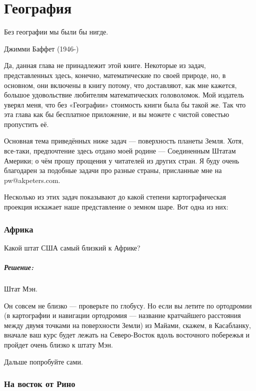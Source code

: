 \chapter*{География}

\epigraph{Без географии  мы были бы нигде.}{Джимми Баффет (1946-)}


Да, данная глава не принадлежит этой книге. %
Некоторые из задач, представленных здесь, конечно, математические по своей природе, %
но,  в основном, они включены в книгу потому, что доставляют, как  мне кажется, большое удовольствие любителям математических головоломок.  Мой издатель уверял меня, что без «Географии» стоимость книги была бы такой же. 
Так что эта глава  как бы бесплатное приложение, и вы можете с чистой совестью  пропустить её.


Основная тема приведённых ниже задач ---  поверхность планеты Земля. Хотя, все-таки, предпочтение здесь отдано моей родине --- Соединенным Штатам Америки;  о чём прошу прощения у читателей из других стран. Я буду очень благодарен за подобные задачи про разные страны, присланные мне на pw@akpeters.com.     


Несколько из этих задач показывают до какой степени %
картографическая проекция %
искажает наше представление о земном шаре. %
Вот одна из них:


\subsection*{Африка}


Какой штат США самый близкий к Африке?


\paragraph{Решение:}  Штат Мэн.\heart
                                  
Он совсем не близко --- проверьте по глобусу.  Но если вы летите по ортодромии  (в картографии и навигации ортодромия --- название кратчайшего расстояния между двумя точками на поверхности Земли)  из Майами, скажем, в Касабланку,  вначале ваш курс %
будет лежать  на Северо-Восток вдоль восточного побережья и пройдет очень близко к штату Мэн.

\medskip

Дальше попробуйте  сами.


\subsection*{На восток от Рино}%


